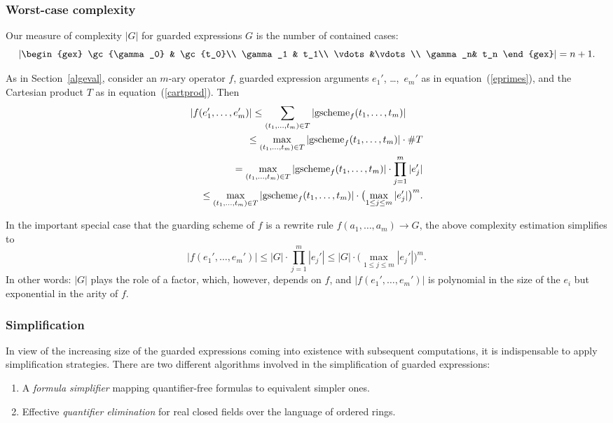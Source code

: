 \subsubsection{Worst-case complexity}
Our measure of complexity $|G|$ for guarded expressions $G$ is the
number of contained cases:
$$
\left|\begin{gex}
\gc{\gamma_0} & \gc{t_0}\\
\gamma_1 & t_1\\
\vdots&\vdots\\
\gamma_n& t_n
\end{gex}\right|=n+1.
$$

As in Section~\ref{algeval}, consider an $m$-ary operator $f$,
guarded expression arguments $e_1'$, \dots,~$e_m'$ as in
equation~(\ref{eprimes}), and the Cartesian product $T$ as in
equation~(\ref{cartprod}). Then
\begin{eqnarray*}
\lefteqn{
|f(e_1',\ldots,e_m')| \leq  \sum_{(t_1,\dots,t_m)\in
T}|\gscheme_f(t_1,\dots,t_m)|}\\
& &{}\leq  \max_{(t_1,\ldots,t_m)\in
T}|\gscheme_f(t_1,\ldots,t_m)|\cdot \#T\\
& & {}=  \max_{(t_1,\ldots,t_m)\in
T}|\gscheme_f(t_1,\ldots,t_m)|\cdot \prod_{j=1}^m|e_j'|\\
& & {}\leq  \max_{(t_1,\ldots,t_m)\in
T}|\gscheme_f(t_1,\ldots,t_m)|\cdot\bigl(\max_{1\leq j\leq m}|e_j'|\bigr)^m.
\end{eqnarray*}

In the important special case that the guarding scheme of $f$ is a
rewrite rule $f(a_1,\ldots,a_m)\to G$, the above complexity
estimation simplifies to
$$
|f(e_1',\ldots,e_m')| \leq  |G|\cdot \prod_{j=1}^m|e_j'| \leq  |G|\cdot
\bigl(\max_{1\leq j\leq m}|e_j'|\bigr)^m.
$$
In other words: $|G|$ plays the role of a factor, which, however,
depends on $f$, and $|f(e_1',\ldots,e_m')|$ is polynomial in the size
of the $e_i$ but exponential in the arity of $f$.

%
\subsubsection{Simplification}
In view of the increasing size of the guarded expressions coming into
existence with subsequent computations, it is indispensable to apply
simplification strategies. There are two different algorithms involved
in the simplification of guarded expressions:
\begin{enumerate}
\item
A {\em formula simplifier} mapping quantifier-free formulas to
equivalent simpler ones.
\item
Effective {\em quantifier elimination} for real closed fields
over the language of ordered rings.
\end{enumerate}

